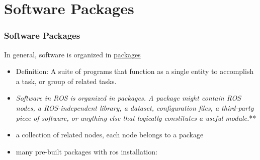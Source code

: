 \documentclass[fleqn]{beamer} %
\newcommand{\sectiontitleIII}{Software Packages}
\begin{document}
\section{\sectiontitleIII}

	\begin{frame}[label=sectionIII] \small
		\frametitle{\sectiontitleIII}
		
		{\large In general, software is organized in \href{http://wiki.ros.org/Packages}{packages}}

                \begin{itemize}
					\item Definition: A suite of programs that function as a single entity to accomplish a task, or group of related tasks.                           
                                                       
                
                    \item {\it Software in ROS is organized in packages. A package might contain ROS nodes, a ROS-independent library, a dataset, configuration files, a third-party piece of software, or anything else that logically constitutes a useful module.}** 
                    \item a collection of related nodes, each node belongs to a package
                     \item many pre-built packages with ros installation: {\selectfont  {\bf -desktop-full}}
                          \end{itemize}           
	\end{frame}
\end{document}
